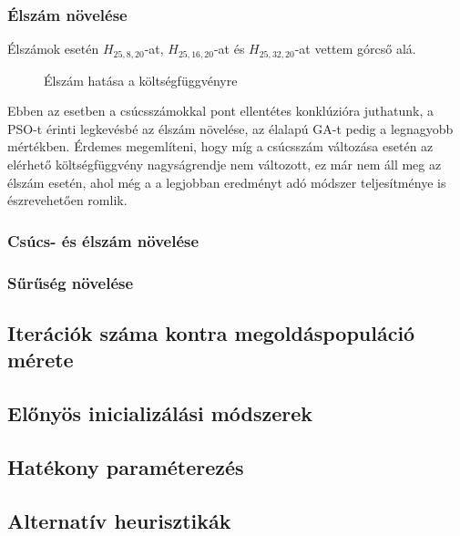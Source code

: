 \subsubsection{Élszám növelése}

Élszámok esetén $H_{25,8,20}$-at, $H_{25,16,20}$-at és $H_{25,32,20}$-at vettem górcső alá.

\begin{figure}[H]
	\centering
	\hspace{5pt}
	\hspace{5pt}
	\caption{Élszám hatása a költségfüggvényre}
\end{figure}

Ebben az esetben a csúcsszámokkal pont ellentétes konklúzióra juthatunk, a PSO-t érinti legkevésbé az élszám növelése, az élalapú GA-t pedig a legnagyobb mértékben. Érdemes megemlíteni, hogy míg a csúcsszám változása esetén az elérhető költségfüggvény nagyságrendje nem változott, ez már nem áll meg az élszám esetén, ahol még a a legjobban eredményt adó módszer teljesítménye is észrevehetően romlik. 

\subsubsection{Csúcs- és élszám növelése}
\subsubsection{Sűrűség növelése}

\subsection{Iterációk száma kontra megoldáspopuláció mérete}


\subsection{Előnyös inicializálási módszerek}


\subsection{Hatékony paraméterezés}


\subsection{Alternatív heurisztikák}


